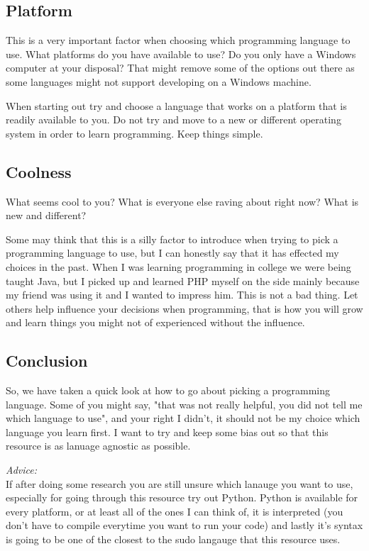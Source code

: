 \subsection{Platform}
This is a very important factor when choosing which programming language to use.
What platforms do you have available to use?
Do you only have a Windows computer at your disposal?
That might remove some of the options out there as some languages might not support developing on a Windows machine.
\par

When starting out try and choose a language that works on a platform that is readily available to you.
Do not try and move to a new or different operating system in order to learn programming.
Keep things simple.

\subsection{Coolness}
What seems cool to you?
What is everyone else raving about right now?
What is new and different?
\par

Some may think that this is a silly factor to introduce when trying to pick a programming language to use, but I can honestly
say that it has effected my choices in the past.
When I was learning programming in college we were being taught Java, but I picked up and learned PHP myself on the side
mainly because my friend was using it and I wanted to impress him.
This is not a bad thing.
Let others help influence your decisions when programming, that is how you will grow and learn things you might not of
experienced without the influence.


\subsection{Conclusion}
So, we have taken a quick look at how to go about picking a programming language.
Some of you might say, "that was not really helpful, you did not tell me which language to use", and your right I didn't, it should not
be my choice which language you learn first.
I want to try and keep some bias out so that this resource is as lanuage agnostic as possible.
\par 

\emph{Advice:}
\\
If after doing some research you are still unsure which lanauge you want to use, especially for going through this resource try out
Python.
Python is available for every platform, or at least all of the ones I can think of, it is interpreted (you don't have to compile everytime
you want to run your code) and lastly it's syntax is going to be one of the closest to the sudo langauge that this resource uses.
